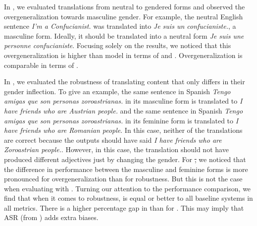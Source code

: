 In \engx, we evaluated translations from neutral to gendered forms and observed the overgeneralization towards masculine gender. For example, the neutral English sentence \textit{I'm a Confucianist.} was translated into \textit{Je suis un confucianiste.}, a masculine form. Ideally, it should be translated into a neutral form \textit{Je suis une personne confucianiste}. Focusing solely on the results, we noticed that this overgeneralization is higher than \mfourtlg model in terms of \chrf and \asrchrf. Overgeneralization is comparable in terms of \blaser. %

In \xeng, we evaluated the robustness of translating content that only differs in their gender inflection. To give an example, the same sentence in Spanish \textit{Tengo amigas que son personas zoroastrianas.} in its masculine form is translated to	\textit{I have friends who are Austrian people.} and the same sentence in Spanish \textit{Tengo amigas que son personas zoroastrianas.} in its feminine form is translated to \textit{I have friends who are Romanian people}. In this case, neither of the translations are correct because the outputs should have said \textit{I have friends who are Zoroastrian people.}. However, in this case, the translation should not have produced different adjectives just by changing the gender. For \st, we noticed that the difference in performance between the masculine and feminine forms is more pronounced for overgeneralization than for robustness. But this is not the case when evaluating \sst with \blaser. Turning our attention to the performance comparison, we find that when it comes to robustness, \mfourttwo is equal or better to all baseline systems in all metrics. There is a higher percentage gap in \asrchrf than for \blaser. This may imply that ASR (from \asrchrf) adds extra biases.




